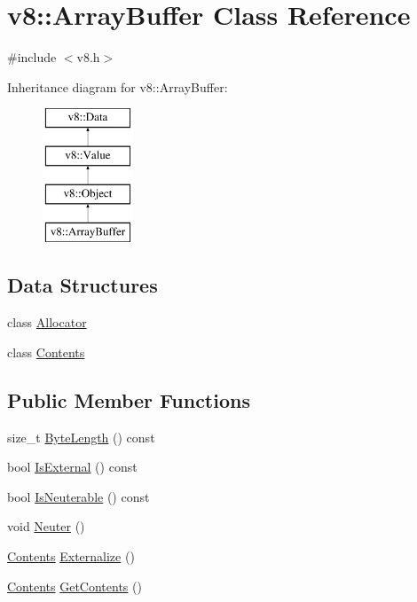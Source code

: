 \hypertarget{classv8_1_1ArrayBuffer}{}\section{v8\+:\+:Array\+Buffer Class Reference}
\label{classv8_1_1ArrayBuffer}


{\ttfamily \#include $<$v8.\+h$>$}

Inheritance diagram for v8\+:\+:Array\+Buffer\+:\begin{figure}[H]
\begin{center}
\leavevmode
\includegraphics[height=4.000000cm]{classv8_1_1ArrayBuffer}
\end{center}
\end{figure}
\subsection*{Data Structures}
\begin{DoxyCompactItemize}
\item 
class \mbox{\hyperlink{classv8_1_1ArrayBuffer_1_1Allocator}{Allocator}}
\item 
class \mbox{\hyperlink{classv8_1_1ArrayBuffer_1_1Contents}{Contents}}
\end{DoxyCompactItemize}
\subsection*{Public Member Functions}
\begin{DoxyCompactItemize}
\item 
size\+\_\+t \mbox{\hyperlink{classv8_1_1ArrayBuffer_af4c4ad8075f74892ed3fa217219a2626}{Byte\+Length}} () const
\item 
bool \mbox{\hyperlink{classv8_1_1ArrayBuffer_a22ecea76af2257b12bdb69b40d9bec8f}{Is\+External}} () const
\item 
bool \mbox{\hyperlink{classv8_1_1ArrayBuffer_a5de3f4c29744bd89204462f987ecb626}{Is\+Neuterable}} () const
\item 
void \mbox{\hyperlink{classv8_1_1ArrayBuffer_a3420f7d38a8fe20e8f40fb82e6acb325}{Neuter}} ()
\item 
\mbox{\hyperlink{classv8_1_1ArrayBuffer_1_1Contents}{Contents}} \mbox{\hyperlink{classv8_1_1ArrayBuffer_a8b90b72486cfacb4fbec157f4803f889}{Externalize}} ()
\item 
\mbox{\hyperlink{classv8_1_1ArrayBuffer_1_1Contents}{Contents}} \mbox{\hyperlink{classv8_1_1ArrayBuffer_ae44291df12ca35de9b519e7372aa640a}{Get\+Contents}} ()
\end{DoxyCompactItemize}
